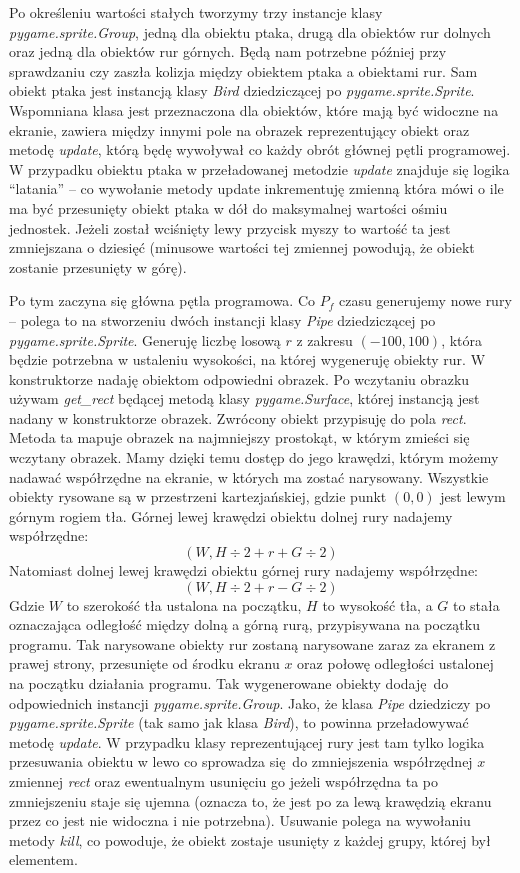 \documentclass[a4paper,12pt,oneside]{book}
\begin{document}
Po określeniu wartości stałych tworzymy trzy instancje klasy
\textit{pygame.sprite.Group}, jedną dla obiektu ptaka, drugą dla obiektów rur
dolnych oraz jedną dla obiektów rur górnych. Będą nam potrzebne później przy
sprawdzaniu czy zaszła kolizja między obiektem ptaka a obiektami rur.
Sam obiekt ptaka jest instancją klasy \textit{Bird} dziedziczącej po
\textit{pygame.sprite.Sprite}. Wspomniana klasa jest przeznaczona dla obiektów,
które mają być widoczne na ekranie, zawiera między innymi
pole na obrazek reprezentujący obiekt oraz metodę
\textit{update}\cite{pygame_sprite_documentation}, którą będę wywoływał co
każdy obrót głównej pętli programowej. W przypadku obiektu ptaka w
przeładowanej metodzie \textit{update} znajduje się logika ``latania'' --
co wywołanie metody update inkrementuję zmienną która mówi o ile ma
być przesunięty obiekt ptaka w dół do maksymalnej wartości ośmiu jednostek.
Jeżeli został wciśnięty lewy przycisk myszy to wartość ta jest zmniejszana o
dziesięć (minusowe wartości tej zmiennej powodują, że obiekt zostanie
przesunięty w górę).

Po tym zaczyna się główna pętla programowa. Co $P_f$ czasu generujemy nowe rury
-- polega to na stworzeniu dwóch instancji klasy \textit{Pipe} dziedziczącej
po \textit{pygame.sprite.Sprite}. Generuję liczbę losową $r$ z zakresu
$(-100, 100)$, która będzie potrzebna w ustaleniu wysokości, na której 
wygeneruję obiekty rur. W konstruktorze nadaję obiektom odpowiedni
obrazek. Po wczytaniu obrazku używam \textit{get\_rect}
będącej metodą klasy \textit{pygame.Surface}, której instancją jest nadany w
konstruktorze obrazek. Zwrócony obiekt przypisuję do pola \textit{rect}.
Metoda ta mapuje obrazek na najmniejszy prostokąt, w którym zmieści się
wczytany obrazek. Mamy dzięki temu dostęp do jego krawędzi, którym możemy
nadawać współrzędne na ekranie, w których ma zostać narysowany.
Wszystkie obiekty rysowane są w przestrzeni kartezjańskiej, gdzie punkt
$(0,0)$ jest lewym górnym rogiem tła.
Górnej lewej krawędzi obiektu dolnej rury nadajemy współrzędne:
\[(W, H \div 2 + r + G \div 2)\]
Natomiast dolnej lewej krawędzi obiektu górnej rury nadajemy współrzędne:
\[(W, H \div 2 + r - G \div 2)\]
Gdzie $W$ to szerokość tła ustalona na początku, $H$ to wysokość tła, a
$G$ to stała oznaczająca odległość między dolną a górną rurą, przypisywana
na początku programu. 
Tak narysowane obiekty rur zostaną narysowane zaraz za ekranem z prawej strony,
przesunięte od środku ekranu $x$ oraz połowę odległości ustalonej na początku
działania programu. Tak wygenerowane obiekty dodaję do odpowiednich instancji
\textit{pygame.sprite.Group}. Jako, że klasa \textit{Pipe} dziedziczy po
\textit{pygame.sprite.Sprite} (tak samo jak klasa \textit{Bird}), to powinna
przeładowywać metodę \textit{update}\cite{pygame_sprite_documentation}.
W przypadku klasy reprezentującej rury jest tam tylko logika przesuwania
obiektu w lewo co sprowadza się do zmniejszenia współrzędnej $x$ 
zmiennej \textit{rect} oraz ewentualnym usunięciu go jeżeli współrzędna ta
po zmniejszeniu staje się ujemna (oznacza to, że jest po za lewą krawędzią
ekranu przez co jest nie widoczna i nie potrzebna). Usuwanie polega na
wywołaniu metody \textit{kill}, co powoduje, że obiekt zostaje usunięty
z każdej grupy, której był elementem.
\end{document}
